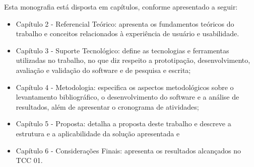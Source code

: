 \begin{description}
    \item Esta monografia está disposta em capítulos, conforme apresentado a seguir:
          \begin{itemize}
              \item Capítulo 2 - Referencial Teórico: apresenta os fundamentos teóricos do trabalho e conceitos relacionados à experiência de usuário e usabilidade.

              \item Capítulo 3 - Suporte Tecnológico: define as tecnologias e ferramentas utilizadas no trabalho, no que diz respeito a prototipação, desenvolvimento,
                    avaliação e validação do software e de pesquisa e escrita;

              \item Capítulo 4 - Metodologia: especifica os aspectos metodológicos sobre o levantamento bibliográfico, o desenvolvimento do software e a análise de
              resultados, além de apresentar o cronograma de atividades;

              \item Capítulo 5 - Proposta: detalha a proposta deste trabalho e descreve a estrutura e a aplicabilidade da solução apresentada e

              \item Capítulo 6 - Considerações Finais: apresenta os resultados alcançados no TCC 01.
          \end{itemize}
\end{description}

